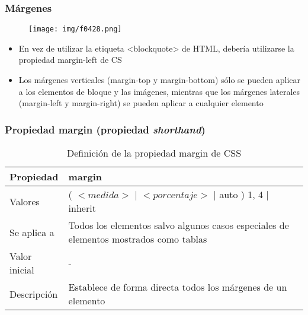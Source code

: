 
\begin{frame}
\frametitle{Márgenes}


\begin{center}
\begin{figure}[p]
\texttt{[image: img/f0428.png]}
\end{figure}
\end{center}

\begin{itemize}
  \item En vez de utilizar la etiqueta <blockquote> de HTML, debería utilizarse la propiedad margin-left de CS
  \item Los márgenes verticales (margin-top y margin-bottom) sólo se pueden aplicar a los elementos de bloque y las imágenes, mientras que los márgenes laterales (margin-left y margin-right) se pueden aplicar a cualquier elemento
\end{itemize}

\end{frame}


\begin{frame}
\frametitle{Propiedad margin (propiedad \emph{shorthand})}

\begin{center}
  \begin{table}
   \begin{tabular}{p{1.8cm}p{7.8cm}}
Propiedad &\bf{margin} \\ \hline
Valores & ( $<medida>$ | $<porcentaje>$ | auto ) {1, 4} | inherit \\ \hline
Se aplica a & Todos los elementos salvo algunos casos especiales de elementos mostrados como tablas \\ \hline
Valor inicial & - \\ \hline
Descripción & Establece de forma directa todos los márgenes de un elemento \\ \hline
 \end{tabular}
   \caption{Definición de la propiedad margin de CSS}
 \end{table}
\end{center}

\end{frame}


